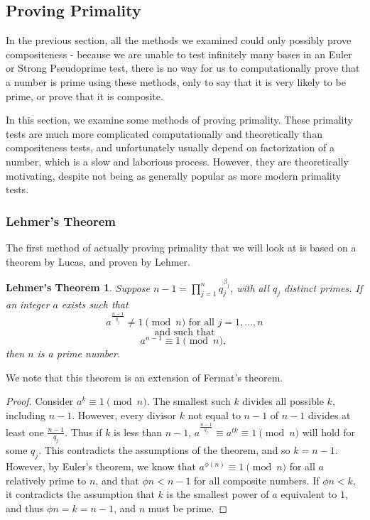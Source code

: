 \documentclass{article}
\begin{document}
\subsection*{Proving Primality}

\par In the previous section, all the methods we examined could only possibly prove compositeness - because we are unable to test
infinitely many bases in an Euler or Strong Pseudoprime test, there is no way for us to computationally prove that a number is prime using
these methods, only to say that it is very likely to be prime, or prove that it is composite. 
\par In this section, we examine some methods of proving primality. These primality tests are much more complicated computationally and theoretically than compositeness tests, and unfortunately usually depend on factorization of a number, which is a slow and laborious 
process. However, they are theoretically motivating, despite not being as generally popular as more modern primality tests.

\subsubsection*{Lehmer's Theorem}

\par The first method of actually proving primality that we will look at is based on a theorem by Lucas, and proven by Lehmer.

\newtheorem*{lehmer}{Lehmer's Theorem}
\begin{lehmer}
Suppose $n-1 = \prod^n_{j=1} q_j^{\beta_j}$, with all $q_j$ distinct primes. If an integer $a$ exists such that 
	$$a^\frac{n-1}{q_j} \neq 1 \pmod n \text{ for all } j = 1, \ldots, n$$
	$$\text { and such that }$$
	$$a^{n-1} \equiv 1\pmod n \text{, }$$
then $n$ is a prime number.
\end{lehmer}
We note that this theorem is an extension of Fermat's theorem. 
\begin{proof}
Consider $a^k \equiv 1 \pmod n$. The smallest such $k$ divides all possible $k$, including $n-1$. However, every divisor $k$ not equal to $n-1$ of $n-1$ divides at least one $\frac{n-1}{q_j}$. Thus if $k$ is  less than $n-1$,  $a^{\frac{n-1}{q_j}} \equiv a^{tk}\equiv 1 \pmod n$ will hold for some $q_j$. This contradicts the assumptions of the theorem, and so $k = n-1$. However, by Euler's theorem, we know that $a^{\phi(n)} \equiv 1 \pmod n$ for all $a$ relatively prime to $n$, and that $\phi{n} < n-1$ for all composite numbers. If $\phi{n} < k$, it contradicts the assumption that $k$ is the smallest power of $a$ equivalent to $1$, and thus $\phi{n} = k = n-1$, and $n$ must be prime.
\end{proof}
\end{document}
